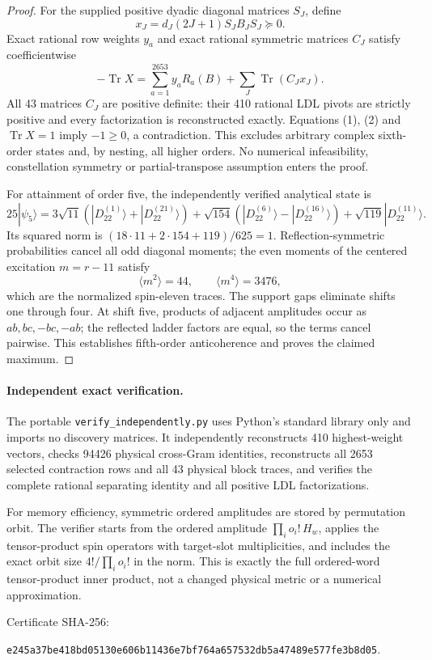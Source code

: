 \documentclass[11pt]{article}
\newcommand{\Tr}{\operatorname{Tr}}
\begin{document}
\begin{proof}
For the supplied positive dyadic diagonal matrices $S_J$, define
\[
x_J=d_J(2J+1)S_JB_JS_J\succeq0.
\]
Exact rational row weights $y_a$ and exact rational symmetric matrices $C_J$ satisfy coefficientwise
\[
\boxed{-\Tr X=\sum_{a=1}^{2653}y_aR_a(B)+\sum_J\Tr(C_Jx_J).} \tag{2}
\]
All 43 matrices $C_J$ are positive definite: their 410 rational LDL pivots are strictly positive and every factorization is reconstructed exactly. Equations (1), (2) and $\Tr X=1$ imply $-1\ge0$, a contradiction. This excludes arbitrary complex sixth-order states and, by nesting, all higher orders. No numerical infeasibility, constellation symmetry or partial-transpose assumption enters the proof.

For attainment of order five, the independently verified analytical state is
\[
25|\psi_5\rangle=
3\sqrt{11}(|D_{22}^{(1)}\rangle+|D_{22}^{(21)}\rangle)
+\sqrt{154}(|D_{22}^{(6)}\rangle-|D_{22}^{(16)}\rangle)
+\sqrt{119}|D_{22}^{(11)}\rangle.
\]
Its squared norm is $(18\cdot11+2\cdot154+119)/625=1$.
Reflection-symmetric probabilities cancel all odd diagonal moments; the even moments of the centered excitation $m=r-11$ satisfy
\[
\langle m^2\rangle=44,\qquad \langle m^4\rangle=3476,
\]
which are the normalized spin-eleven traces. The support gaps eliminate shifts one through four. At shift five, products of adjacent amplitudes occur as $ab,bc,-bc,-ab$; the reflected ladder factors are equal, so the terms cancel pairwise. This establishes fifth-order anticoherence and proves the claimed maximum.
\end{proof}
\paragraph{Independent exact verification.}
The portable \texttt{verify\_independently.py} uses Python's standard library only and imports no discovery matrices. It independently reconstructs 410 highest-weight vectors, checks 94426 physical cross-Gram identities, reconstructs all 2653 selected contraction rows and all 43 physical block traces, and verifies the complete rational separating identity and all positive LDL factorizations.

For memory efficiency, symmetric ordered amplitudes are stored by permutation orbit. The verifier starts from the ordered amplitude $\prod_i o_i!\,H_w$, applies the tensor-product spin operators with target-slot multiplicities, and includes the exact orbit size $4!/\prod_i o_i!$ in the norm. This is exactly the full ordered-word tensor-product inner product, not a changed physical metric or a numerical approximation.

Certificate SHA-256:
\begin{center}\small\texttt{e245a37be418bd05130e606b11436e7bf764a657532db5a47489e577fe3b8d05}.\end{center}
\end{document}
